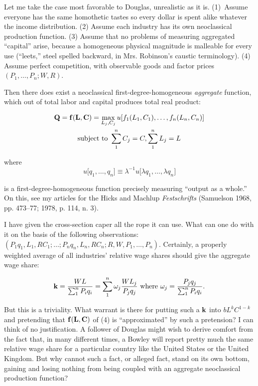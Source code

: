 \documentclass{article}
\begin{document}
Let me take the case most favorable to Douglas, unrealistic as it is. (1)~Assume everyone has the same homothetic tastes so every dollar is spent alike whatever the income distribution. (2) Assume each industry has its own neoclassical production function. (3) Assume that no problems of measuring aggregated ``capital'' arise, because a homogeneous physical magnitude is malleable for every use (``leets,'' steel spelled backward, in Mrs. Robinson's caustic terminology). (4) Assume perfect competition, with observable goods and factor prices \((P_1,\dots ,P_n;W,R)\).

Then there does exist a neoclassical first-degree-homogeneous \emph{aggregate} function, which out of total labor and capital produces total real product:

\begin{equation}\label{eq4}
  \begin{gathered}
	\vb{Q} = \vb{f} (\vb{L},\vb{C}) 
	= \max_{L_j, C_j} u \lbrack f_1 (L_1,C_1 ), \dots ,f_n (L_n,C_n ) \rbrack \\
	\text{subject to }\sum_1^nC_j =C,\sum_1^nL_j =L
  \end{gathered}
\end{equation}%

\noindent where \begin{equation*}
u \lbrack q_1, \dots ,q_n \rbrack \equiv \lambda^{-1} u \lbrack \lambda q_1, \dots ,\lambda q_n \rbrack
\end{equation*}


\noindent is a first-degree-homogeneous function precisely measuring ``output as a whole.'' On this, see my articles for the Hicks and Machlup \emph{Festschrifts} (Samuelson 1968, pp. 473--77; 1978, p. 114, n. 3).

I have given the cross-section caper all the rope it can use. What can one do with it on the basis of the following observations: \((P_1 q_1,L_1,RC_1; \allowbreak  \dots ; \allowbreak P_n q_n,L_n,RC_n; \allowbreak R,W,P_1, \dots ,P_n )\). Certainly, a properly weighted average of all industries' relative wage shares should give the aggregate wage share:

\begin{equation}\label{eq5}
\vb{k}=\frac{WL}{\sum_1^n P_i q_i}=\sum_1^n \omega_j \frac{WL_j}{P_j q_j}\text{ where }\omega_j=\frac{P_j q_j}{\sum_1^n P_i q_i}.%
\end{equation}

But this is a triviality. What warrant is there for putting such a \(\vb{k}\) into \(bL^kC^{1-k}\) and pretending that \(\vb{f} (\vb{L},\vb{C})\) of (4) is ``approximated'' by such a pretension? I can think of no justification. A follower of Douglas might wish to derive comfort from the fact that, in many different times, a Bowley will report pretty much the same relative wage share for a particular country like the United States or the United Kingdom. But why cannot such a fact, or alleged fact, stand on its own bottom, gaining and losing nothing from being coupled with an aggregate neoclassical production function?
\end{document}

